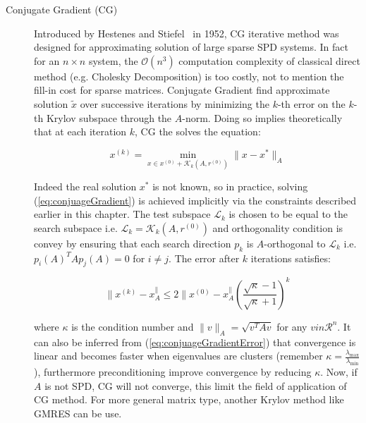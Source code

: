 \begin{description}


\item[Conjugate Gradient (CG)] Introduced by Hestenes and Stiefel~\cite{hestenes_methods_1952} in 1952, CG iterative method was designed for approximating solution of large sparse SPD systems. In fact for an $n \times n$ system, the $\mathcal{O}(n^3)$ computation complexity of classical direct method (e.g. Cholesky Decomposition) is too costly, not to mention the fill-in cost for sparse matrices. Conjugate Gradient find approximate solution $\tilde{x}$ over successive iterations by minimizing the $k$-th error on the  $k$-th Krylov subspace through the $A$-norm. Doing so implies theoretically that at each iteration $k$, CG the solves the equation:

\begin{equation}
    x^{(k)} = \min_{x \in x^{(0)} + \mathcal{K}_k(A, r^{(0)})} \| x - x^* \|_A
    \label{eq:conjuageGradient}
\end{equation}

Indeed the real solution $x^*$ is not known, so in practice, solving (\ref{eq:conjuageGradient}) is achieved implicitly via the constraints described earlier in this chapter. The test subspace $\mathcal{L}_k$ is chosen to be equal to the search subspace i.e. $\mathcal{L}_k = \mathcal{K}_k(A, r^{(0)})$ and orthogonality condition is convey by ensuring that each search direction $p_k$ is $A$-orthogonal to $\mathcal{L}_k$ i.e. $p_i{(A)}^{T}Ap_j{(A)} = 0$ for $i \neq j$. The error after $k$ iterations satisfies:

\begin{equation}
    \|x^{(k)} - x^\|_A \leq 2 \|x^{(0)} - x^\|_A \left( \frac{\sqrt{\kappa} - 1}{\sqrt{\kappa} + 1} \right)^k
    \label{eq:conjuageGradientError}
\end{equation}

where $\kappa$ is the condition number and $\|v\|_A = \sqrt{v^T A v}$ for any $v in \mathcal{R}^n$. It can also be inferred from (\ref{eq:conjuageGradientError}) that convergence is linear and becomes faster when eigenvalues are clusters (remember $\kappa = \frac{\lambda_{\max}}{\lambda_{\min}}$), furthermore preconditioning improve convergence by reducing $\kappa$. Now, if $A$ is not SPD, CG will not converge, this limit the field of application of CG method. For more general matrix type, another Krylov method like GMRES can be use.


\end{description}
